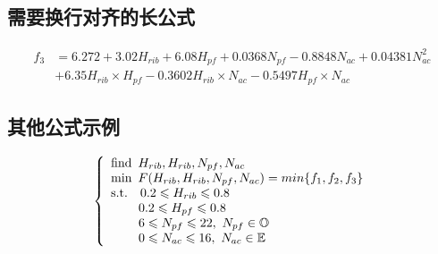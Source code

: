 \subsection{需要换行对齐的长公式}

\begin{equation}\label{eq:P}
    \begin{split}
        f_3 & = 6.272 + 3.02 H_{rib} + 6.08 H_{pf} + 0.0368 N_{pf} - 0.8848 N_{ac} + 0.04381 N_{ac}^2\\
        & + 6.35 H_{rib} \times H_{pf} - 0.3602 H_{rib}\times N_{ac} - 0.5497 H_{pf}\times N_{ac}
    \end{split}
\end{equation}

\subsection{其他公式示例}
\begin{equation}
    \begin{aligned}
    \left\{
        \begin{array}{l}
        \text {find}\enspace H_{rib},H_{rib},N_{pf},N_{ac} \\
        \text {min} \enspace F(H_{rib},H_{rib},N_{pf},N_{ac})= min\{f_1,f_2,f_3\} \\

            \text{s.t.\enspace}\enspace 0.2 \leqslant H_{rib} \leqslant 0.8    \\
            \hspace{2.2em} 0.2 \leqslant H_{pf} \leqslant 0.8                     \\
            \hspace{2.2em} 6 \leqslant N_{pf} \leqslant 22,\ N_{pf}\in \mathbb{O} \\
            \hspace{2.2em} 0 \leqslant N_{ac} \leqslant 16,\ N_{ac}\in \mathbb{E}
        \end{array}
    \right. 
    \end{aligned}
    \label{eq:MO}
\end{equation}